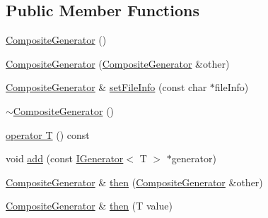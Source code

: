 \subsection*{Public Member Functions}
\begin{DoxyCompactItemize}
\item 
\hyperlink{class_catch_1_1_composite_generator_a923398b140371d1783858766864a1af5}{Composite\-Generator} ()
\item 
\hyperlink{class_catch_1_1_composite_generator_a21a7070a00e4a6fe021294c356692692}{Composite\-Generator} (\hyperlink{class_catch_1_1_composite_generator}{Composite\-Generator} \&other)
\item 
\hyperlink{class_catch_1_1_composite_generator}{Composite\-Generator} \& \hyperlink{class_catch_1_1_composite_generator_ac3c57cf4ca5472f440bf71e2936bcd4a}{set\-File\-Info} (const char $\ast$file\-Info)
\item 
\hyperlink{class_catch_1_1_composite_generator_a5766205abd7004c508c20ddbb5e5555e}{$\sim$\-Composite\-Generator} ()
\item 
\hyperlink{class_catch_1_1_composite_generator_aa3f627d84fb256df0404d19d7fd4b784}{operator T} () const 
\item 
void \hyperlink{class_catch_1_1_composite_generator_af3774d42ad2d3453d089ca599efe0517}{add} (const \hyperlink{struct_catch_1_1_i_generator}{I\-Generator}$<$ T $>$ $\ast$generator)
\item 
\hyperlink{class_catch_1_1_composite_generator}{Composite\-Generator} \& \hyperlink{class_catch_1_1_composite_generator_a2e03f42df85cdd238aabd77a80b075d5}{then} (\hyperlink{class_catch_1_1_composite_generator}{Composite\-Generator} \&other)
\item 
\hyperlink{class_catch_1_1_composite_generator}{Composite\-Generator} \& \hyperlink{class_catch_1_1_composite_generator_aefdc11bcfccdf07d2db5f0da3ed8758c}{then} (T value)
\end{DoxyCompactItemize}


